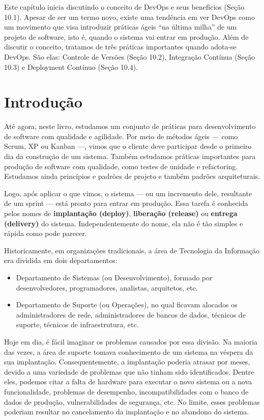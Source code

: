 \documentclass[
  11pt,
  twoside]{book}
\begin{document}
Este capítulo inicia discutindo o conceito de DevOps e seus benefícios
(Seção 10.1). Apesar de ser um termo novo, existe uma tendência em ver
DevOps como um movimento que visa introduzir práticas ágeis ``na última
milha'' de um projeto de software, isto é, quando o sistema vai entrar
em produção. Além de discutir o conceito, tratamos de três práticas
importantes quando adota-se DevOps. São elas: Controle de Versões (Seção
10.2), Integração Contínua (Seção 10.3) e Deployment Contínuo (Seção
10.4).

\hypertarget{introduuxe7uxe3o-7}{%
\section{Introdução}\label{introduuxe7uxe3o-7}}


Até agora, neste livro, estudamos um conjunto de práticas para
desenvolvimento de software com qualidade e agilidade. Por meio de
métodos ágeis --- como Scrum, XP ou Kanban ---, vimos que o cliente deve
participar desde o primeiro dia da construção de um sistema. Também
estudamos práticas importantes para produção de software com qualidade,
como testes de unidade e refactoring. Estudamos ainda princípios e
padrões de projeto e também padrões arquiteturais.

Logo, após aplicar o que vimos, o sistema --- ou um incremento dele,
resultante de um sprint --- está pronto para entrar em produção. Essa
tarefa é conhecida pelos nomes de \textbf{implantação (deploy)},
\textbf{liberação (release)} ou \textbf{entrega (delivery)} do sistema.
Independentemente do nome, ela não é tão simples e rápida como pode
parecer.

Historicamente, em organizações tradicionais, a área de Tecnologia da
Informação era dividida em dois departamentos:

\begin{itemize}
\item
  Departamento de Sistemas (ou Desenvolvimento), formado por
  desenvolvedores, programadores, analistas, arquitetos, etc.
\item
  Departamento de Suporte (ou Operações), no qual ficavam alocados os
  administradores de rede, administradores de bancos de dados, técnicos
  de suporte, técnicos de infraestrutura, etc.
\end{itemize}

Hoje em dia, é fácil imaginar os problemas causados por essa divisão. Na
maioria das vezes, a área de suporte tomava conhecimento de um sistema
na véspera da sua implantação. Consequentemente, a implantação poderia
atrasar por meses, devido a uma variedade de problemas que não tinham
sido identificados. Dentre eles, podemos citar a falta de hardware para
executar o novo sistema ou a nova funcionalidade, problemas de
desempenho, incompatibilidades com o banco de dados de produção,
vulnerabilidades de segurança, etc. No limite, esses problemas poderiam
resultar no cancelamento da implantação e no abandono do sistema.
\end{document}
